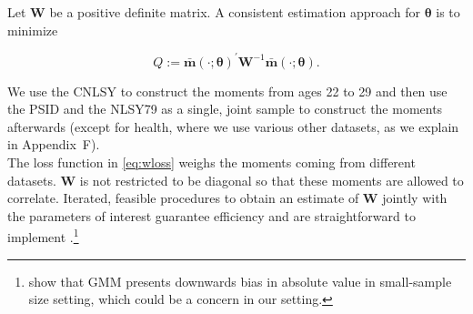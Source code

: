 \noindent Let $\bm{W}$ be a positive definite matrix. A consistent estimation approach for $\bm{\theta}$ is to minimize 

\begin{equation}
Q :=  {\bm{\bar{m}} \left( \cdot ; \bm{\theta} \right) }^{'} \bm{W} ^{-1} {\bm{\bar{m}} \left( \cdot ; \bm{\theta} \right)}. \label{eq:wloss}
\end{equation}

\noindent We use the CNLSY to construct the moments from ages 22 to 29 and then use the PSID and the NLSY79 as a single, joint sample to construct the moments afterwards (except for health, where we use various other datasets, as we explain in Appendix~F).\\

\noindent The loss function in \eqref{eq:wloss} weighs the moments coming from different datasets. $\bm{W}$ is not restricted to be diagonal so that these moments are allowed to correlate. Iterated, feasible procedures to obtain an estimate of $\bm{W}$ jointly with the parameters of interest guarantee efficiency and are straightforward to implement \citep{Hansen_1982_Econometrica,Amemiya_1985_advanced}.\footnote{\citet{Altonji_Segal_1996_JoBaES} show that GMM presents downwards bias in absolute value in small-sample size setting, which could be a concern in our setting.} 

\singlespace






